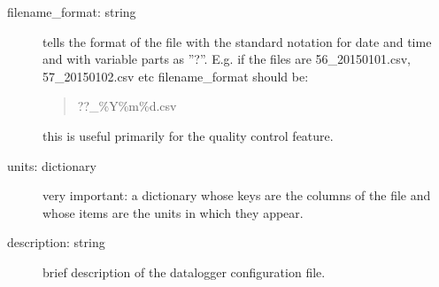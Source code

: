 \documentclass[a4paper,10pt,english]{sphinxmanual}
\begin{document}
\begin{fulllineitems}
\begin{description}
\item[{filename\_format: string}] \leavevmode
tells the format of the file with the standard notation for date and time and with variable
parts as ''?''. E.g. if the files are 56\_20150101.csv, 57\_20150102.csv etc filename\_format should be:
\begin{quote}

??\_\%Y\%m\%d.csv
\end{quote}

this is useful primarily for the quality control feature.

\item[{units: dictionary}] \leavevmode
very important: a dictionary whose keys are the columns of the file and whose items are
the units in which they appear.

\item[{description: string}] \leavevmode
brief description of the datalogger configuration file.

\end{description}

\end{fulllineitems}

\end{document}
